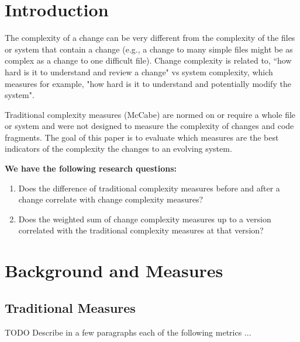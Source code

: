 \documentclass[11pt,twoside,a4paper]{article}
\begin{document}
\section{Introduction}

The complexity of a change can be very different from the complexity of the
files or system that contain a change (e.g., a change to many simple files
might be as complex as a change to one difficult file). Change complexity is
related to, ``how hard is it to understand and review a change" vs system
complexity, which measures for example, "how hard is it to understand and
potentially modify the system". 

Traditional complexity measures (\eg McCabe) are normed on or require a whole
file or system and were not designed to measure the complexity of changes and
code fragments. The goal of this paper is to evaluate which measures are the
best indicators of the complexity the changes to an evolving system. 


\textbf{We have the following research questions:}

\begin{enumerate}

\item Does the difference of traditional complexity measures before and after a change correlate with change complexity measures?

\item Does the weighted sum of change complexity measures up to a version correlated with the traditional complexity measures at that version? 

\end{enumerate}

\section{Background and Measures}

\subsection{Traditional Measures}
TODO Describe in a few paragraphs each of the following metrics ...
\end{document}
